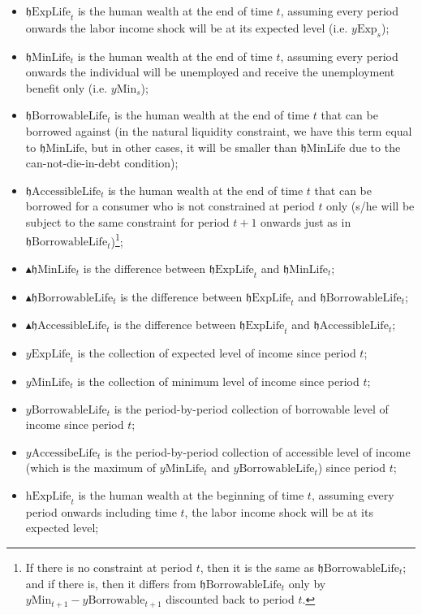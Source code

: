 \documentclass[titlepage,abstract]{\econtex}
\providecommand{\hExpLife}{\mathrm{h}\text{ExpLife}}
\providecommand{\hEndExpLife}{\mathfrak{h}\text{ExpLife}}
\providecommand{\hEndMinLife}{\mathfrak{h}\text{MinLife}}
\providecommand{\hEndBorrowableLife}{\mathfrak{h}\text{BorrowableLife}}
\providecommand{\hEndAccessibleLife}{\mathfrak{h}\text{AccessibleLife}}
\providecommand{\DeltahEndMinLife}{\blacktriangle \mathfrak{h}\text{MinLife}}
\providecommand{\DeltahEndBorrowableLife}{\blacktriangle \mathfrak{h}\text{BorrowableLife}}
\providecommand{\DeltahEndAccessibleLife}{\blacktriangle \mathfrak{h}\text{AccessibleLife}}
\providecommand{\yMinLife}{y\text{MinLife}}
\providecommand{\yBorrowableLife}{y\text{BorrowableLife}}
\providecommand{\yAccessibleLife}{y\text{AccessibeLife}}
\providecommand{\yExpLife}{y\text{ExpLife}}
\providecommand{\yMin}{y\text{Min}}
\providecommand{\yBorrowable}{y\text{Borrowable}}
\providecommand{\yExp}{y\text{Exp}}
\begin{document}
\begin{itemize}
          \begin{itemize}
          \item $\hEndExpLife_{t}$ is the human wealth at the end of time $t$, assuming every period onwards the labor income shock will be at its expected level (i.e. $\yExp_{s}$);
          \item $\hEndMinLife_{t}$ is the human wealth at the end of time $t$, assuming every period onwards the individual will be unemployed and receive the unemployment benefit only (i.e. $\yMin_{s}$);
          \item $\hEndBorrowableLife_{t}$ is the human wealth at the end of time $t$ that can be borrowed against (in the natural liquidity constraint, we have this term equal to $\hEndMinLife$, but in other cases, it will be smaller than $\hEndMinLife$ due to the can-not-die-in-debt condition);   
          \item $\hEndAccessibleLife_{t}$ is the human wealth at the end of time $t$ that can be borrowed for a consumer who is not constrained at period $t$ only (s/he will be subject to the same constraint for period $t+1$ onwards just as in $\hEndBorrowableLife_{t}$)\footnote{If there is no constraint at period $t$, then it is the same as $\hEndBorrowableLife_{t}$; and if there is, then it differs from $\hEndBorrowableLife_{t}$ only by $\yMin_{t+1}-\yBorrowable_{t+1}$ discounted back to period $t$.};
          \item $\DeltahEndMinLife_{t}$ is the difference between $\hEndExpLife_{t}$ and $\hEndMinLife_{t}$;
           \item $\DeltahEndBorrowableLife_{t}$ is the difference between $\hEndExpLife_{t}$ and $\hEndBorrowableLife_{t}$;
           \item $\DeltahEndAccessibleLife_{t}$ is the difference between $\hEndExpLife_{t}$ and $\hEndAccessibleLife_{t}$;
           \item $\yExpLife_{t}$ is the collection of expected level of income since period $t$;
           \item $\yMinLife_{t}$ is the collection of minimum level of income since period $t$;
           \item $\yBorrowableLife_{t}$ is the period-by-period collection of borrowable level of income since period $t$;
           \item $\yAccessibleLife_{t}$ is the period-by-period collection of accessible level of income (which is the maximum of $\yMinLife_{t}$ and $\yBorrowableLife_{t}$) since period $t$;
           \item $\hExpLife_{t}$ is the human wealth at the beginning of time $t$, assuming every period onwards including time $t$, the labor income shock will be at its expected level;

\end{itemize}
\end{itemize}
\end{document}
